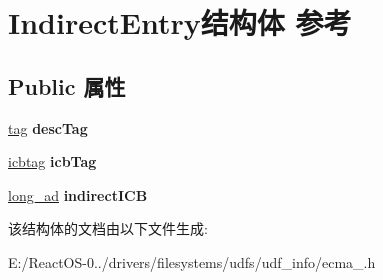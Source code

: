 \hypertarget{struct_indirect_entry}{}\section{Indirect\+Entry结构体 参考}
\label{struct_indirect_entry}
\subsection*{Public 属性}
\begin{DoxyCompactItemize}
\item 
\mbox{\label{struct_indirect_entry_a9015fe5b916e3e6bb7d722b6ff5813a4}} 
\hyperlink{structtag}{tag} {\bfseries desc\+Tag}
\item 
\mbox{\label{struct_indirect_entry_a3226b8ca980d39db2ebe404edbd36692}} 
\hyperlink{structicbtag}{icbtag} {\bfseries icb\+Tag}
\item 
\mbox{\label{struct_indirect_entry_aee5cb7d34baa1410e57e7b5664fe192b}} 
\hyperlink{structlong__ad}{long\+\_\+ad} {\bfseries indirect\+I\+CB}
\end{DoxyCompactItemize}


该结构体的文档由以下文件生成\+:\begin{DoxyCompactItemize}
\item 
E\+:/\+React\+O\+S-\/0../drivers/filesystems/udfs/udf\+\_\+info/ecma\+\_.\+h\end{DoxyCompactItemize}
